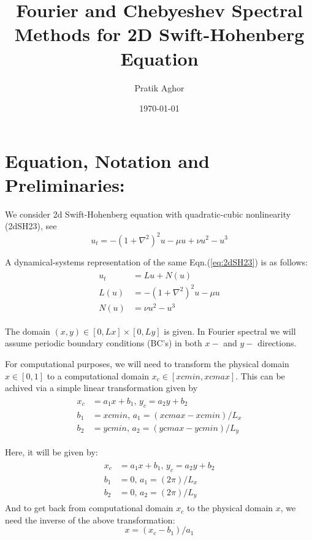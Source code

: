 \documentclass{article}
\author{Pratik Aghor}
\title{Fourier and Chebyeshev Spectral Methods for 2D Swift-Hohenberg Equation}
\date{\today}  %
\begin{document}
\maketitle
\section{Equation, Notation and Preliminaries:}
We consider 2d Swift-Hohenberg equation with quadratic-cubic nonlinearity (2dSH23), see \cite{swift1977hydrodynamic, cross1993pattern, lloyd2008localized}
\begin{equation}\label{eq:2dSH23}
 u_{t} =  -(1+\nabla^{2})^{2}u - \mu u + \nu u^{2} - u^{3}
\end{equation}

A dynamical-systems representation of the same Eqn.(\ref{eq:2dSH23}) is as follows:
\begin{align}\label{eq:2dSH23_abstract}
\begin{split}
 u_{t}  &=  Lu + N(u)\\
 L(u)   &= -(1+\nabla^{2})^{2}u - \mu u \\
 N(u)   &= \nu u^{2} - u^{3}
\end{split}
\end{align}

The domain $(x,y)\in[0, Lx] \times [0, Ly]$ is given. In Fourier spectral we will assume periodic boundary conditions (BC's) in both $x-$ and $y-$ directions. 


For computational purposes, we will need to transform the physical domain $x \in [0, 1]$ to a computational domain $x_{c} \in [xcmin, xcmax]$. This can be achived via a simple linear transformation given by
\begin{align}\label{eq:x2xc_abstract}
 \begin{split}
  x_{c} &= a_{1}x + b_{1}\textrm{, }y_{c} = a_{2}y + b_{2}\\
  b_{1}     &= xcmin\textrm{, }a_{1}     = (xcmax-xcmin)/L_{x}\\
  b_{2}     &= ycmin\textrm{, }a_{2}     = (ycmax-ycmin)/L_{y}
 \end{split}
\end{align}

Here, it will be given by:
\begin{align}\label{eq:x2xc}
 \begin{split}
  x_{c} &= a_{1}x + b_{1} \textrm{, } y_{c} = a_{2}y + b_{2}\\
  b_{1}     &= 0 \textrm{, } a_{1} = (2\pi)/L_{x}\\
  b_{2}     &= 0 \textrm{, } a_{2}     = (2\pi)/L_{y}
 \end{split}
\end{align}
And to get back from computational domain $x_{c}$ to the physical domain $x$, we need  the inverse of the above transformation:
\begin{equation}\label{eq:xc2x}
 x = (x_{c}-b_{1})/a_{1}
\end{equation}
\end{document}
